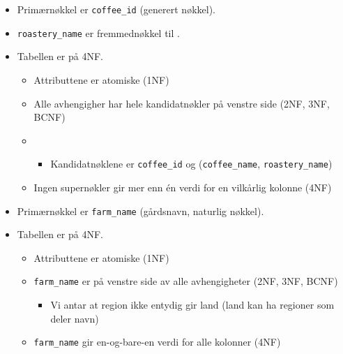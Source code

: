 \pagebreak


\begin{itemize}
    \item Primærnøkkel er \verb|coffee_id| (generert nøkkel).
    \item \verb|roastery_name| er fremmednøkkel til .
    \item Tabellen er på 4NF.
    \begin{itemize}
        \item Attributtene er atomiske (1NF)
        \item Alle avhengigher har hele kandidatnøkler på venstre side (2NF, 3NF, BCNF)
        \item \begin{itemize}
            \item Kandidatnøklene er \verb|coffee_id| og (\verb|coffee_name|, \verb|roastery_name|)
        \end{itemize}
        \item Ingen supernøkler gir mer enn én verdi for en vilkårlig kolonne (4NF)
    \end{itemize}
\end{itemize}

\vspace{0.7cm}


\begin{itemize}
    \item Primærnøkkel er \verb|farm_name| (gårdsnavn, naturlig nøkkel).
    \item Tabellen er på 4NF.
    \begin{itemize}
        \item Attributtene er atomiske (1NF)
        \item \verb|farm_name| er på venstre side av alle avhengigheter (2NF, 3NF, BCNF)
        \begin{itemize}
            \item Vi antar at region ikke entydig gir land (land kan ha regioner som deler navn)
        \end{itemize}
        \item \verb|farm_name| gir en-og-bare-en verdi for alle kolonner (4NF)
    \end{itemize}
\end{itemize}

\vspace{0.7cm}

